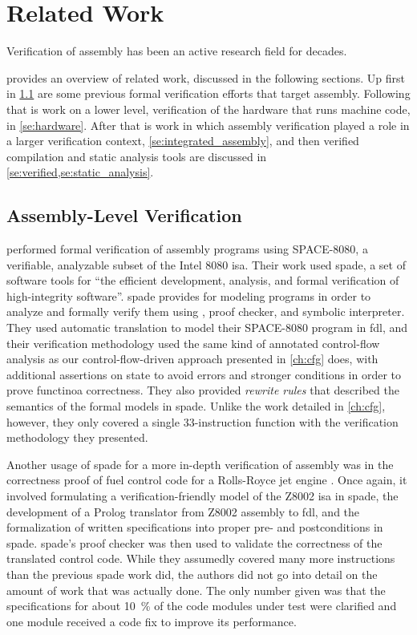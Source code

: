 \chapter{Related Work}\label{ch:related}
Verification of assembly has been an active research field for decades.

 provides an overview of related work,
discussed in the following sections.
Up first in \cref{se:previous_assembly}
are some previous formal verification efforts that target assembly.
Following that is work on a lower level,
verification of the hardware that runs machine code, in \cref{se:hardware}.
After that is work in which assembly verification played a role
in a larger verification context, \cref{se:integrated_assembly},
and then verified compilation and static analysis tools are discussed
in \cref{se:verified,se:static_analysis}.

\section{Assembly-Level Verification}\label{se:previous_assembly}
\textcite{clutterbuck1988verification} performed formal verification
of assembly programs using SPACE-8080, a verifiable,
analyzable subset of the Intel 8080 \ac{isa}.
Their work used \ac{spade}, a set of software tools for ``the efficient development,
analysis, and formal verification of high-integrity software''.
\Ac{spade} provides  for modeling programs
in order to analyze and formally verify them
using , proof checker, and symbolic interpreter.
They used automatic translation to model their SPACE-8080 program
in \ac{fdl}, and their verification methodology used the same kind of
annotated control-flow analysis as our control-flow-driven approach
presented in \cref{ch:cfg} does, with additional assertions on state to avoid errors
and stronger conditions in order to prove functinoa correctness.
They also provided \emph{rewrite rules} that described the semantics
of the formal models in \ac{spade}. Unlike the work detailed in \cref{ch:cfg}, however,
they only covered a single 33-instruction function
with the verification methodology they presented.

Another usage of \ac{spade} for a more in-depth verification of assembly
was in the correctness proof of fuel control code for a Rolls-Royce
jet engine \autocite{oneill1988verification}. Once again,
it involved formulating a verification-friendly model of the Z8002 \ac{isa}
in \ac{spade}, the development of a Prolog translator from Z8002 assembly to \ac{fdl},
and the formalization of written specifications into proper pre- and postconditions
in \ac{spade}. \Ac{spade}'s proof checker was then used to validate the correctness
of the translated control code. While they assumedly covered many more instructions
than the previous \ac{spade} work did, the authors did not go into detail
on the amount of work that was actually done.
The only number given was that the specifications for about \SI{10}{\percent}
of the code modules under test were clarified
and one module received a code fix to improve its performance.

